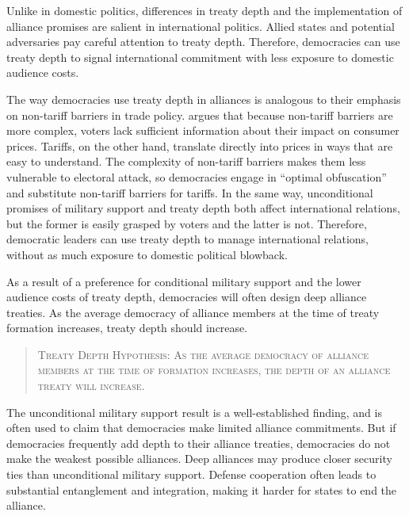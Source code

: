 \documentclass[12pt]{article}
\begin{document}
Unlike in domestic politics, differences in treaty depth and the implementation of alliance promises are salient in international politics. 
Allied states and potential adversaries pay careful attention to treaty depth. 
Therefore, democracies can use treaty depth to signal international commitment with less exposure to domestic audience costs. 


The way democracies use treaty depth in alliances is analogous to their emphasis on non-tariff barriers in trade policy.
\citet{Kono2006} argues that because non-tariff barriers are more complex, voters lack sufficient information about their impact on consumer prices.
Tariffs, on the other hand, translate directly into prices in ways that are easy to understand.
The complexity of non-tariff barriers makes them less vulnerable to electoral attack, so democracies engage in ``optimal obfuscation'' and substitute non-tariff barriers for tariffs. 
In the same way, unconditional promises of military support and treaty depth both affect international relations, but the former is easily grasped by voters and the latter is not. 
Therefore, democratic leaders can use treaty depth to manage international relations, without as much exposure to domestic political blowback.


As a result of a preference for conditional military support and the lower audience costs of treaty depth, democracies will often design deep alliance treaties. 
As the average democracy of alliance members at the time of treaty formation increases, treaty depth should increase. 


\begin{quote}
\textsc{Treaty Depth Hypothesis: As the average democracy of alliance members at the time of formation increases, the depth of an alliance treaty will increase.}
\end{quote} 


The unconditional military support result is a well-established finding, and is often used to claim that democracies make limited alliance commitments. 
But if democracies frequently add depth to their alliance treaties, democracies do not make the weakest possible alliances. 
Deep alliances may produce closer security ties than unconditional military support. 
Defense cooperation often leads to substantial entanglement and integration, making it harder for states to end the alliance. 
\end{document}
